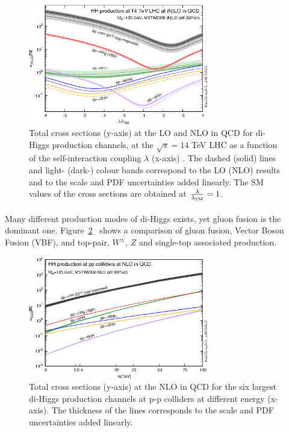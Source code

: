 \begin{figure}[h!]
  \centering
  \captionsetup{justification=centering}
  \includegraphics[width=0.7\textwidth]{figures/theory/HH_lam}
  \caption{Total cross sections (y-axis) at the LO and NLO in QCD for di-Higgs production channels, at the $\sqrt{s} = 14$ TeV LHC as a function of the self-interaction coupling $\lambda$ (x-axis) . The dashed (solid) lines and light- (dark-) colour bands correspond to the LO (NLO) results and to the scale and PDF uncertainties added linearly. The SM values of the cross sections are obtained at $\frac{\rm \lambda}{\rm \lambda_{\rm SM}} = 1$.}
  \label{fig:SM_HH_lam}
\end{figure}

\paragraph{}
Many different production modes of di-Higgs exists, yet gluon fusion is the dominant one. Figure~\ref{fig:SM_HH_xsec}~\cite{Frederix:2014hta} shows a comparison of gluon fusion, Vector Boson Fusion (VBF), and top-pair, $W^{\pm}$, $Z$ and single-top associated production.

\begin{figure}[h!]
  \centering
  \captionsetup{justification=centering}
  \includegraphics[width=0.7\textwidth]{figures/theory/HH_xsec}
  \caption{Total cross sections (y-axis) at the NLO in QCD for the six largest di-Higgs production channels at p-p colliders at different energy (x-axis). The thickness of the lines corresponds to the scale and PDF uncertainties added linearly.}
  \label{fig:SM_HH_xsec}
\end{figure}

